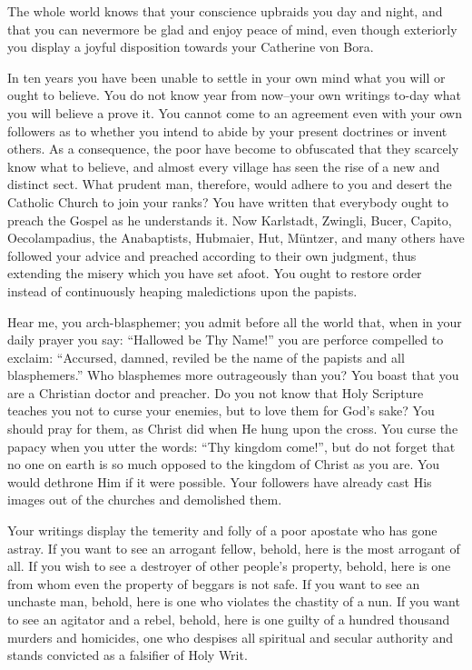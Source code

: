 The whole world knows that your conscience upbraids you day and night,
and that you can nevermore be glad and enjoy peace of mind, even though
exteriorly you display a joyful disposition towards your Catherine von Bora.

In ten years you have been unable to settle in your own mind what you
will or ought to believe. You do not know year from now--your own writings
to-day what you will believe a prove it. You cannot come to an agreement
even with your own followers as to whether you intend to abide by
your present doctrines or invent others. As a consequence, the poor have
become to obfuscated that they scarcely know what to believe, and
almost every village has seen the rise of a new and distinct sect. What
prudent man, therefore, would adhere to you and desert the Catholic Church to
join your ranks? You have written that everybody ought to preach the
Gospel as he understands it. Now Karlstadt, Zwingli, Bucer, Capito,
Oecolampadius, the Anabaptists, Hubmaier, Hut, Müntzer, and many
others have followed your advice and preached according to their own judgment, thus
extending the misery which you have set afoot. You ought to restore order
instead of continuously heaping maledictions upon the papists.

Hear me, you arch-blasphemer; you admit before all the world that, when
in your daily prayer you say: “Hallowed be Thy Name!” you are perforce
compelled to exclaim: “Accursed, damned, reviled be the name of the papists
and all blasphemers.” Who blasphemes more outrageously than you? You
boast that you are a Christian doctor and preacher. Do you not know that
Holy Scripture teaches you not to curse your enemies, but to love them for
God’s sake? You should pray for them, as Christ did when He hung upon the
cross. You curse the papacy when you utter the words: “Thy kingdom
come!”, but do not forget that no one on earth is so much opposed to the
kingdom of Christ as you are. You would dethrone Him if it were possible.
Your followers have already cast His images out of the churches and demolished
them.

Your writings display the temerity and folly of a poor apostate who has
gone astray. If you want to see an arrogant fellow, behold, here is the most
arrogant of all. If you wish to see a destroyer of other people’s property,
behold, here is one from whom even the property of beggars is not safe. If you
want to see an unchaste man, behold, here is one who violates the chastity of
a nun. If you want to see an agitator and a rebel, behold, here is one guilty
of a hundred thousand murders and homicides, one who despises all spiritual
and secular authority and stands convicted as a falsifier of Holy Writ.

